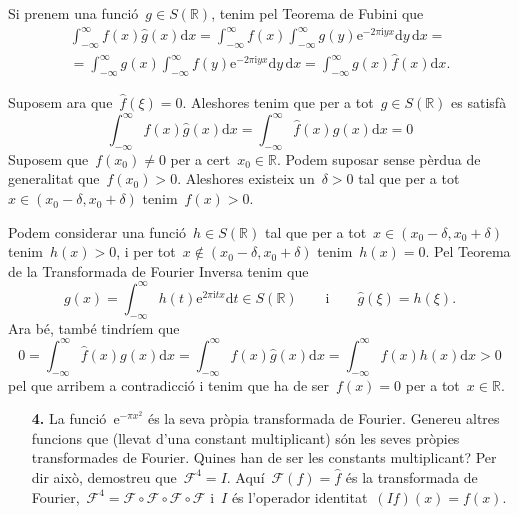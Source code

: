 \documentclass[a4paper]{article}
\theoremstyle{definition}
\newcommand{\iu}{\mathrm{i}}
\newcommand{\e}{\mathrm{e}}
\newcommand{\uppi}{\pi}
\newcommand{\diff}{\mathrm{d}}
\newcommand{\F}{\mathcal{F}}
\begin{document}
Si prenem una funció~\(g\in S(\mathbb{R})\), tenim pel Teorema de Fubini que
\begin{multline*}
    \int_{-\infty}^{\infty} f(x)\widehat{g}(x) \diff x
    = \int_{-\infty}^{\infty} f(x)
    \int_{-\infty}^{\infty} g(y) \e^{-2\uppi\iu yx} \diff y\, \diff x = \\
    = \int_{-\infty}^{\infty} g(x)
    \int_{-\infty}^{\infty} f(y) \e^{-2\uppi\iu yx} \diff y\, \diff x
    = \int_{-\infty}^{\infty} g(x)\widehat{f}(x) \diff x.
\end{multline*}

Suposem ara que~\(\widehat{f}(\xi) = 0\).
Aleshores tenim que per a tot~\(g\in S(\mathbb{R})\) es satisfà
\[
    \int_{-\infty}^{\infty} f(x)\widehat{g}(x) \diff x
    = \int_{-\infty}^{\infty} \widehat{f}(x) g(x) \diff x
    = 0
\]
Suposem que~\(f(x_{0}) \neq 0\) per a cert~\(x_{0}\in\mathbb{R}\).
Podem suposar sense pèrdua de generalitat que~\(f(x_{0}) > 0\).
Aleshores existeix un~\(\delta>0\) tal que per a
tot~\(x\in(x_{0}-\delta,x_{0}+\delta)\) tenim~\(f(x) > 0\).

Podem considerar una funció~\(h\in S(\mathbb{R})\) tal que per a
tot~\(x\in(x_{0}-\delta,x_{0}+\delta)\) tenim~\(h(x) > 0\), i per
tot~\(x\notin(x_{0}-\delta,x_{0}+\delta)\) tenim~\(h(x) = 0\).
Pel Teorema de la Transformada de Fourier Inversa tenim que
\[
    g(x)=\int_{-\infty}^{\infty}h(t)\e^{2\uppi\iu tx}\diff t\in S(\mathbb{R})
    \qquad\text{i}\qquad
    \widehat{g}(\xi) = h(\xi).
\]
Ara bé, també tindríem que
\[
    0
    = \int_{-\infty}^{\infty} \widehat{f}(x) g(x) \diff x
    = \int_{-\infty}^{\infty} f(x)\widehat{g}(x) \diff x
    = \int_{-\infty}^{\infty} f(x)h(x) \diff x
    > 0
\]
pel que arribem a contradicció i tenim que ha de ser~\(f(x) = 0\) per a
tot~\(x\in\mathbb{R}\).

\begin{enumerate}
    \item[\textbf{4.}] La funció~\(\e^{-\uppi x^{2}}\) és la seva pròpia
        transformada de Fourier.
        Genereu altres funcions que (llevat d'una constant multiplicant) són les
        seves pròpies transformades de Fourier.
        Quines han de ser les constants multiplicant?
        Per dir això, demostreu que~\(\F^{4} = I\).
        Aquí~\(\F(f) = \widehat{f}\) és la transformada de Fourier,~\(\F^{4} =
        \F\circ\F\circ\F\circ\F\) i~\(I\) és l'operador identitat~\((If)(x) =
        f(x)\).
\end{enumerate}
\end{document}
